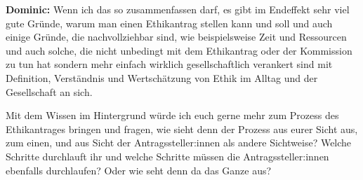 \documentclass[a4paper,12pt,twoside]{scrreprt}
\begin{document}
\textbf{Dominic:} Wenn ich das so zusammenfassen darf, es gibt im Endeffekt sehr viel gute Gründe, warum man einen Ethikantrag stellen kann und soll und auch einige Gründe, die nachvollziehbar sind, wie beispielsweise Zeit und Ressourcen und auch solche, die nicht unbedingt mit dem Ethikantrag oder der Kommission zu tun hat sondern mehr einfach wirklich gesellschaftlich verankert sind mit Definition, Verständnis und Wertschätzung von Ethik im Alltag und der Gesellschaft an sich.

Mit dem Wissen im Hintergrund würde ich euch gerne mehr zum Prozess des Ethikantrages bringen und fragen, wie sieht denn der Prozess aus eurer Sicht aus, zum einen, und aus Sicht der Antragssteller:innen als andere Sichtweise? Welche Schritte durchlauft ihr und welche Schritte müssen die Antragssteller:innen ebenfalls durchlaufen? Oder wie seht denn da das Ganze aus?
\end{document}
